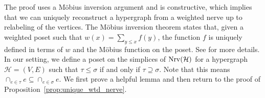 \documentclass{amsart}
\renewcommand{\H}{\mathcal{H}}
\newcommand{\Nrv}{\mm{\mathrm{Nrv}}}
\newcommand {\mm}[1]        {\ifmmode{#1}\else{\mbox{\(#1\)}}\fi}
\newcommand{\cEP}[1]{{\textcolor{blue}{[Comment from Emilie: #1]}}}
\begin{document}

The proof uses a M\"{o}bius inversion argument and is constructive, which implies that we can uniquely reconstruct a hypergraph from a weighted nerve up to relabeling of the vertices.
The M\"obius inversion theorem states that, given a weighted poset such that $w(x) = \sum_{y\leq x} f(y)$, the function $f$ is uniquely defined in terms of $w$ and the M\"obius function on the poset. See \cite[Sec. 3.7]{stanleyEC1} for more details. In our setting, we define a poset on the simplices of $\Nrv(\H)$ for a hypergraph $\H=(V, E)$ such that $\tau \leq \sigma$ if and only if $\tau \supseteq \sigma$. Note that this means $\cap_{e \in \tau} e \subseteq \cap_{e \in \sigma} e$. We first prove a helpful lemma and then return to the proof of Proposition~\ref{prop:unique_wtd_nerve}.
\end{document}
